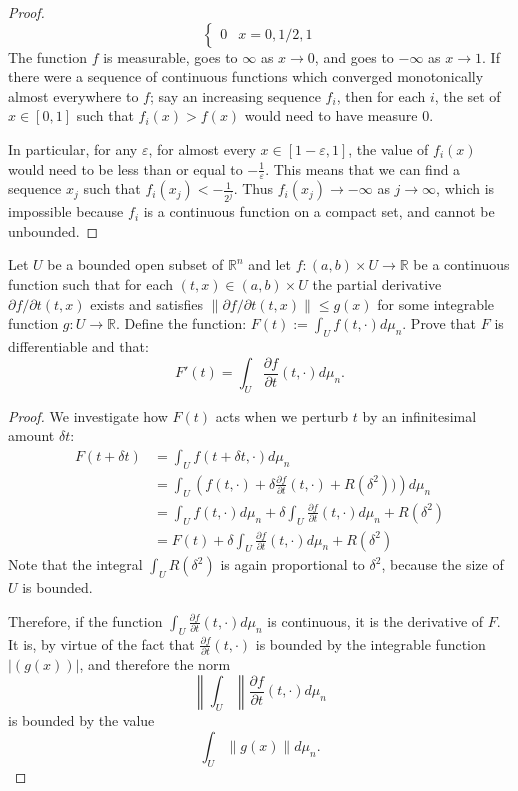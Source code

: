 \documentclass[12pt]{article}
\newcommand{\R}{\mathbb{R}}
\theoremstyle{definition}
\newenvironment{problem}[2][Problem]{\begin{trivlist}
\item[\hskip \labelsep {\bfseries #1}\hskip \labelsep {\bfseries #2.}]}{\end{trivlist}}
\begin{document}
\begin{problem}{2}
\begin{proof}
\[\begin{cases}
			0 & x = 0, 1/2, 1
\end{cases}\]
The function $f$ is measurable, goes to $\infty$ as $x \to 0$, and goes to $-\infty$ as $x \to 1$. If there were a sequence of continuous functions which converged monotonically almost everywhere to $f$; say an increasing sequence $f_i$, then for each $i$, the set of $x \in [0,1]$ such that $f_i(x) > f(x)$ would need to have measure $0$.
\par In particular, for any $\varepsilon$, for almost every $x \in [1 - \varepsilon, 1]$, the value of $f_i(x)$ would need to be less than or equal to $-\frac{1}{\varepsilon}$. This means that we can find a sequence $x_j$ such that $f_i(x_j) < -\frac{1}{2^j}$. Thus $f_i(x_j ) \to -\infty$ as $j \to \infty$, which is impossible because $f_i$ is a continuous function on a compact set, and cannot be unbounded.
	\end{proof}

\end{problem}
\begin{problem}{3}
	Let $U$ be a bounded open subset of $\R^n$ and let $f: (a, b)\times U \to \R$ be a continuous function such that for each $(t, x) \in (a,b)\times U$ the partial derivative $\partial f/ \partial t (t, x)$ exists and satisfies $\left \lVert { \partial f / \partial t(t, x) } \right \lVert \leq g(x)$ for some integrable function $g: U \to \R$. Define the function: $F(t) := \int_U f(t, \cdot) d\mu_n$. Prove that $F$ is differentiable and that:
	\[F'(t) = \int_U \frac{\partial f}{\partial t}(t, \cdot ) d \mu_n.\]
	\begin{proof}
		We investigate how $F(t)$ acts when we perturb $t$ by an infinitesimal amount $\delta t$:
		\begin{align*}
			F(t + \delta t) &= \int_U f(t + \delta t, \cdot ) d \mu_n\\
		&=\int_{U} \left (f(t, \cdot) + \delta \frac{\partial f}{\partial t}(t, \cdot) + R(\delta^2)) \right ) d\mu_n\\
		&= \int_{U} f(t, \cdot )d\mu_n + \delta \int_{U} \frac{\partial f}{\partial t}(t, \cdot) d\mu_n + R(\delta^2)\\
		&= F(t) + \delta \int_{U} \frac{\partial f}{\partial t}(t, \cdot )d \mu_n + R(\delta^2)
		\end{align*}
	Note that the integral $\int_U R(\delta^2)$ is again proportional to $\delta^2$, because the size of $U$ is bounded.
	\par Therefore, if the function $\int_U \frac{\partial f}{\partial t}(t, \cdot)d\mu_n$ is continuous, it is the derivative of $F$. It is, by virtue of the fact that $\frac{\partial f}{\partial t}(t, \cdot)$ is bounded by the integrable function $\left \lvert { (g(x)) } \right \lvert $, and therefore the norm
	\[\left \lVert { \int_U } \right \lVert \frac{\partial f}{\partial t}(t, \cdot )d \mu_n\]
	is bounded by the value
	\[\int_U \left \lVert { g(x) } \right \lVert d\mu_n.\]
	\end{proof}
\end{problem}
\end{document}
